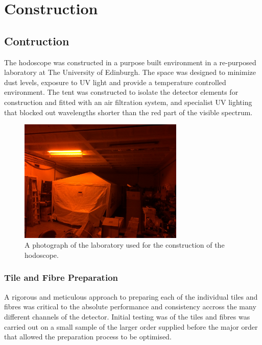 \chapter{Construction}

\section{Contruction}

The hodoscope was constructed in a purpose built environment in a re-purposed laboratory at The University of Edinburgh. The space was designed to minimize dust levels, exposure to UV light and provide a temperature controlled environment. The tent was constructed to isolate the detector elements for construction and fitted with an air filtration system, and specialist UV lighting that blocked out wavelengths shorter than the red part of the visible spectrum.

\begin{figure}[!ht]
	\centering
	\includegraphics[width=0.7\textwidth]{ImgChap1/NoUV_setup1}
	\caption{A photograph of the laboratory used for the construction of the hodoscope.}
	\label{HodoTent}
\end{figure}


\subsection{Tile and Fibre Preparation}

A rigorous and meticulous approach to preparing each of the individual tiles and fibres was critical to the absolute performance and consistency accross the many different channels of the detector. Initial testing was of the tiles and fibres was carried out on a small sample of the larger order supplied before the major order that allowed the preparation process to be optimised.

